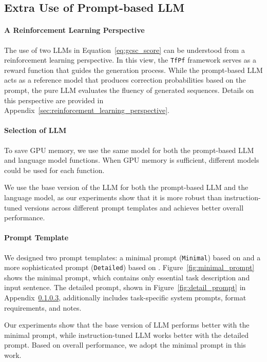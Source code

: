 \subsection{Extra Use of Prompt-based LLM}
\paragraph{A Reinforcement Learning Perspective}
The use of two LLMs in Equation~\ref{eq:gcsc_score} can be understood from a reinforcement learning perspective.
In this view, the \texttt{TfPf} framework serves as a reward function that guides the generation process.
While the prompt-based LLM acts as a reference model that produces correction probabilities based on the prompt, the pure LLM evaluates the fluency of generated sequences.
Details on this perspective are provided in Appendix~\ref{sec:reinforcement_learning_perspective}.

\paragraph{Selection of LLM}
\label{sec:selection_of_llm}
To save GPU memory, we use the same model for both the prompt-based LLM and language model functions.
When GPU memory is sufficient, different models could be used for each function.

We use the base version of the LLM for both the prompt-based LLM and the language model, as our experiments show that it is more robust than instruction-tuned versions across different prompt templates and achieves better overall performance.

\paragraph{Prompt Template}
\label{sec:prompt_template}


We designed two prompt templates: a minimal prompt (\texttt{Minimal}) based on \citet{li-etal-2024-cllm} and a more sophisticated prompt (\texttt{Detailed}) based on \citet{li-etal-2023-ineffectiveness,zhou-etal-2024-simple}.
Figure~\ref{fig:minimal_prompt} shows the minimal prompt, which contains only essential task description and input sentence.
The detailed prompt, shown in Figure~\ref{fig:detail_prompt} in Appendix~\ref{sec:prompt_template}, additionally includes task-specific system prompts, format requirements, and notes.

Our experiments show that the base version of LLM performs better with the minimal prompt, while instruction-tuned LLM works better with the detailed prompt.
Based on overall performance, we adopt the minimal prompt in this work.

